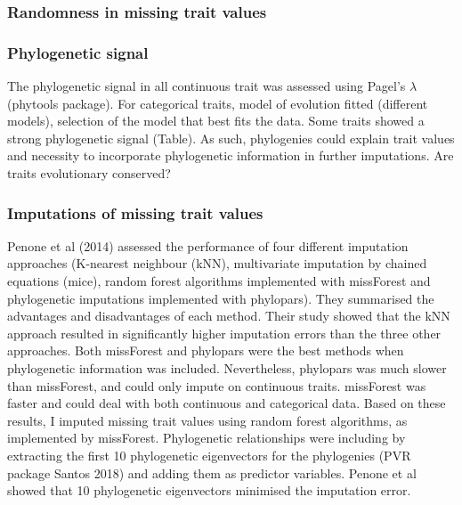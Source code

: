 \subsubsection{Randomness in missing trait values}

\subsubsection{Phylogenetic signal}
The phylogenetic signal in all continuous trait was assessed using Pagel's $\lambda$ (phytools package). 
For categorical traits, model of evolution fitted (different models), selection of the model that best fits the data.
Some traits showed a strong phylogenetic signal (Table). As such, phylogenies could explain trait values and necessity to incorporate phylogenetic information in further imputations. Are traits evolutionary conserved?



\subsubsection{Imputations of missing trait values}
Penone et al (2014) assessed the performance of four different imputation approaches (K-nearest neighbour (kNN), multivariate imputation by chained equations (mice), random forest algorithms implemented with missForest and phylogenetic imputations implemented with phylopars). They summarised the advantages and disadvantages of each method. Their study showed that the kNN approach resulted in significantly higher imputation errors than the three other approaches. Both missForest and phylopars were the best methods when phylogenetic information was included. Nevertheless, phylopars was much slower than missForest, and could only impute on continuous traits. missForest was faster and could deal with both continuous and categorical data.
Based on these results, I imputed missing trait values using random forest algorithms, as implemented by missForest. Phylogenetic relationships were including by extracting the first 10 phylogenetic eigenvectors for the phylogenies (PVR package Santos 2018) and adding them as predictor variables. Penone et al showed that 10 phylogenetic eigenvectors minimised the imputation error. 



